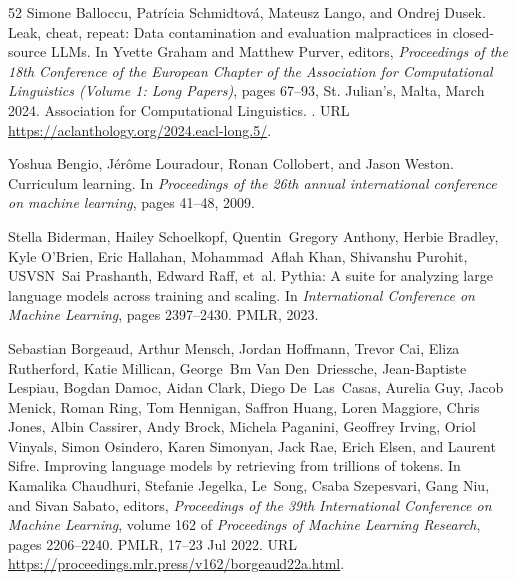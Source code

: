 \begin{thebibliography}{52}
Simone Balloccu, Patr{\'i}cia Schmidtov{\'a}, Mateusz Lango, and Ondrej Dusek.
\newblock Leak, cheat, repeat: Data contamination and evaluation malpractices in closed-source {LLM}s.
\newblock In Yvette Graham and Matthew Purver, editors, \emph{Proceedings of the 18th Conference of the European Chapter of the Association for Computational Linguistics (Volume 1: Long Papers)}, pages 67--93, St. Julian{'}s, Malta, March 2024. Association for Computational Linguistics.
\newblock {}.
\newblock URL \url{https://aclanthology.org/2024.eacl-long.5/}.

Yoshua Bengio, J{\'e}r{\^o}me Louradour, Ronan Collobert, and Jason Weston.
\newblock Curriculum learning.
\newblock In \emph{Proceedings of the 26th annual international conference on machine learning}, pages 41--48, 2009.

Stella Biderman, Hailey Schoelkopf, Quentin~Gregory Anthony, Herbie Bradley, Kyle O'Brien, Eric Hallahan, Mohammad~Aflah Khan, Shivanshu Purohit, USVSN~Sai Prashanth, Edward Raff, et~al.
\newblock Pythia: A suite for analyzing large language models across training and scaling.
\newblock In \emph{International Conference on Machine Learning}, pages 2397--2430. PMLR, 2023.

Sebastian Borgeaud, Arthur Mensch, Jordan Hoffmann, Trevor Cai, Eliza Rutherford, Katie Millican, George~Bm Van Den~Driessche, Jean-Baptiste Lespiau, Bogdan Damoc, Aidan Clark, Diego De~Las~Casas, Aurelia Guy, Jacob Menick, Roman Ring, Tom Hennigan, Saffron Huang, Loren Maggiore, Chris Jones, Albin Cassirer, Andy Brock, Michela Paganini, Geoffrey Irving, Oriol Vinyals, Simon Osindero, Karen Simonyan, Jack Rae, Erich Elsen, and Laurent Sifre.
\newblock Improving language models by retrieving from trillions of tokens.
\newblock In Kamalika Chaudhuri, Stefanie Jegelka, Le~Song, Csaba Szepesvari, Gang Niu, and Sivan Sabato, editors, \emph{Proceedings of the 39th International Conference on Machine Learning}, volume 162 of \emph{Proceedings of Machine Learning Research}, pages 2206--2240. PMLR, 17--23 Jul 2022.
\newblock URL \url{https://proceedings.mlr.press/v162/borgeaud22a.html}.


\end{thebibliography}
